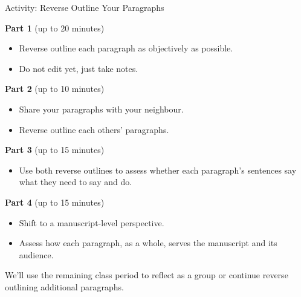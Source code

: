 \documentclass{beamer}
\begin{document}
\begin{frame}{Activity: Reverse Outline Your Paragraphs}

  \footnotesize
  \textbf{Part 1} (up to 20 minutes)
  \begin{itemize}
    \item  Reverse outline each paragraph as objectively as possible.
    \item Do not edit yet, just take notes.
  \end{itemize}

  \medskip
  \textbf{Part 2} (up to 10 minutes)
  \begin{itemize}
    \item  Share your paragraphs with your neighbour.
    \item Reverse outline each others' paragraphs.
  \end{itemize}

  \medskip
  \textbf{Part 3} (up to 15 minutes)
  \begin{itemize}
    \item Use both reverse outlines to assess whether each paragraph's sentences say what they need to say and do.
  \end{itemize}

  \medskip
  \textbf{Part 4} (up to 15 minutes)
  \begin{itemize}
    \item Shift to a manuscript-level perspective.
    \item Assess how each paragraph, as a whole, serves the manuscript
      and its audience.
  \end{itemize}

  \medskip
  We'll use the remaining class period to reflect as a group or continue reverse outlining additional paragraphs.

\end{frame}
\end{document}
